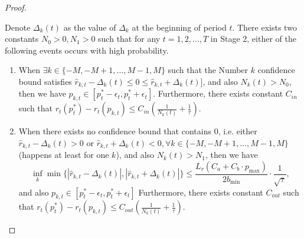 \begin{proof}
\begin{lemma}
    \label{lemma:c20_to_performance}
    Denote $\Delta_k(t)$ as the value of $\Delta_k$ at the beginning of period $t$. There exists two constants $N_0>0, N_1>0$ such that for any $t=1,2,\ldots, T$ in Stage 2, either of the following events occurs with high probability.
    \begin{enumerate}
        \item When $\exists k\in\{-M, -M+1, \ldots, M-1, M\}$ such that the Number $k$ confidence bound satisfies $\hat{r}_{k,t}-\Delta_k(t)\leq 0 \leq \hat{r}_{k,t}+\Delta_k(t)]$, and also $N_k(t)>N_0$, then we have $p_{k, t}\in[p_t^*-\epsilon_t, p_t^*+\epsilon_t]$. Furthermore, there exists constant $C_{in}$ such that $r_t(p_t^*)-r_t(p_{k,t})\leq C_{in}(\frac1{N_k(t)} + \frac1{\tau})$.
        \item When there exists no confidence bound that contains $0$, i.e. either $\hat{r}_{k,t}-\Delta_k(t)>0$ or $\hat{r}_{k,t}+\Delta_k(t)<0, \forall k\in\{-M, -M+1, \ldots, M-1, M\}$ (happens at least for one $k$), and also $N_k(t)>N_1$, then we have $$\inf_{k}\min\{|\hat{r}_{k,t}-\Delta_k(t)|, |\hat{r}_{k,t}+\Delta_k(t)|\}\leq \frac{L_r(C_a + C_b\cdot p_{\max})}{2b_{\min}}\cdot\frac1{\sqrt{\tau}},$$ and also $p_{k, t}\in[p_t^*-\epsilon_t, p_t^*+\epsilon_t]$ Furthermore, there exists constant $C_{out}$ such that $r_t(p_t^*)-r_t(p_{k,t})\leq C_{out}(\frac1{N_k(t)} + \frac1{\tau})$. 
    \end{enumerate}
\end{lemma}


\end{proof}

